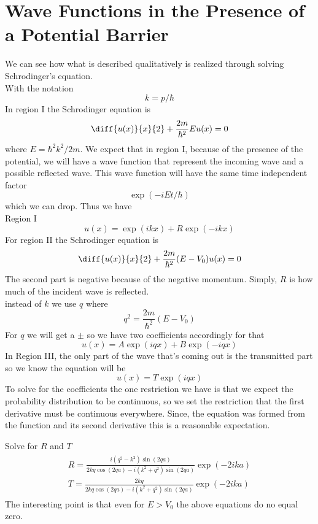 \section{Wave Functions in the Presence of a Potential Barrier}
We can see how what is described qualitatively is realized through solving Schrodinger's equation. \\
With the notation
\[ k = p/\hbar \]
In region I the Schrodinger equation is
\[ \diff{u(x)}{x}{2} + \frac{2m}{\hbar ^2} E u(x) = 0 \]
where $ E = \hbar^2k^2/2m $. We expect that in region I, because of the presence of the potential, we will have a wave function that represent the incoming wave and a possible reflected wave. This wave function will have the same time independent factor
\[ \exp(-iEt/\hbar) \]
which we can drop. Thus we have\\
Region I
\[ u(x) = \exp(ikx) + R \exp(-ikx) \]
For region II the Schrodinger equation is
\[ \diff{u(x)}{x}{2} + \frac{2m}{\hbar ^2} (E-V_0) u(x) = 0 \]
The second part is negative because of the negative momentum. Simply, $ R $ is how much of the incident wave is reflected. \\
instead of $ k $ we use $ q $ where
\[ q^2 = \frac{2m}{\hbar^2} (E - V_0)\]
For $ q $ we will get a $ \pm $ so we have two coefficients accordingly for that
\[ u(x) = A \exp (iqx) + B \exp(-iqx) \]
In Region III, the only part of the wave that's coming out is the transmitted part so we know the equation will be 
\[ u(x) = T \exp (iqx)  \]
To solve for the coefficients the one restriction we have is that we expect the probability distribution to be continuous, so we set the restriction that the first derivative must be continuous everywhere. Since, the equation was formed from the function and its second derivative this is a reasonable expectation. 
\begin{example}
	Solve for $ R $ and $ T $ \\
	\begin{align}
	\begin{array} { c } { R = \frac { i \left( q ^ { 2 } - k ^ { 2 } \right) \sin ( 2 q a ) } { 2 k q \cos ( 2 q a ) - i \left( k ^ { 2 } + q ^ { 2 } \right) \sin ( 2 q a ) } \exp ( - 2 i k a ) } \\ { T = \frac { 2 k q } { 2 k q \cos ( 2 q a ) - i \left( k ^ { 2 } + q ^ { 2 } \right) \sin ( 2 q a ) } \exp ( - 2 i k a ) } \end{array}
	\end{align}
	The interesting point is that even for $ E > V_0 $ the above equations do no equal zero. 
\end{example}

